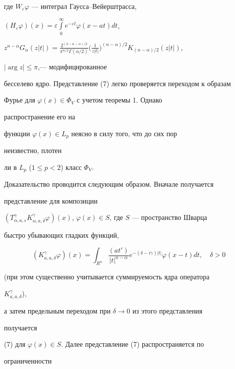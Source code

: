 где $W_\varepsilon\varphi$ --- интеграл Гаусса--Вейерштрасса, 


$(H_\varepsilon\varphi)(x)=\varepsilon\int\limits^\infty_0 


e^{-\varepsilon t}\varphi(x-at)dt$, 


$z^{n-\alpha}G_\alpha(z|t|)= 


\frac{2^{(2-n-\alpha)/2}}{\pi^{n/2}\Gamma(\alpha/2)} 


\big(\frac{1}{z|t|}\big)^{(n-\alpha)/2} 


K_{(n-\alpha)/2}(z|t|)$,


$|\arg z|\le \pi$,--- модифицированное  


бесселево ядро. Представление (7) легко проверяется переходом к образам  


Фурье для $\varphi(x)\in\Phi_V$ с учетом теоремы 1. Однако 


распространение его на  


функции $\varphi(x)\in L_p$ неясно в силу того, что до сих пор 


неизвестно, плотен  


ли в $L_p$ ($1\le p<2$) класс $\Phi_V$. 


 


Доказательство проводится следующим образом. Вначале получается 


представление для композиции 


$(T^\gamma_{\alpha,a,\varepsilon}K^\gamma_{\alpha,a,\delta}\varphi)


(x)$, $\varphi(x)\in S$, где $S$ --- пространство Шварца  


быстро убывающих гладких функций, 


$$ 


(K^\gamma_{a,a,\delta}\varphi)(x)=\int_{R^n} 


\frac{(at')}{|t|^{n-\alpha}}e^{-(\delta-i\gamma)|t|} 


\varphi(x-t)dt,\quad \delta>0 


$$ 


(при этом существенно учитывается суммируемость ядра оператора 


$K^\gamma_{a,a,\delta}$), 


а затем предельным переходом при $\delta\to0$ из этого представления 


получается 


(7) для $\varphi(x)\in S$. Далее представление (7) распространяется по 


ограниченности  


